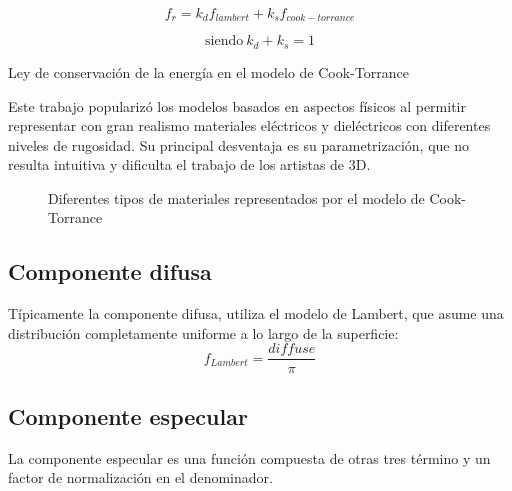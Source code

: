     \singlespacing
    $$
    f_r = k_{d}f_{lambert} + k_sf_{cook-torrance}
    $$
    \begin{eqfloat}[!htb]
        \begin{equation}
            \textrm{siendo}\ k_d + k_s = 1
        \end{equation}
        \caption{Ley de conservaci\'on de la energ\'ia en el modelo de Cook-Torrance \autocite{cooktorrance}}
    \end{eqfloat}
    
    Este trabajo populariz\'o los modelos basados en aspectos f\'isicos al permitir representar con gran realismo materiales
    el\'ectricos y diel\'ectricos con diferentes niveles de rugosidad. Su principal desventaja es su parametrizaci\'on, que
    no resulta intuitiva y dificulta el trabajo de los artistas de 3D.

    \begin{figure}[H]
        \centering
        \caption{Diferentes tipos de materiales representados por el modelo de Cook-Torrance \autocite{cooktorrance}}
    \end{figure}

    

        \subsection{Componente difusa}
        T\'ipicamente la componente difusa, utiliza el modelo de Lambert, que asume una distribuci\'on completamente uniforme a lo
        largo de la superficie:\\
        
        \begin{equation}
        f_{Lambert} = \frac{diffuse}{\pi}
        \end{equation}
        \singlespacing
    
        \subsection{Componente especular}
            La componente especular es una funci\'on compuesta de otras tres t\'ermino y un factor de normalizaci\'on en el
            denominador.\\

